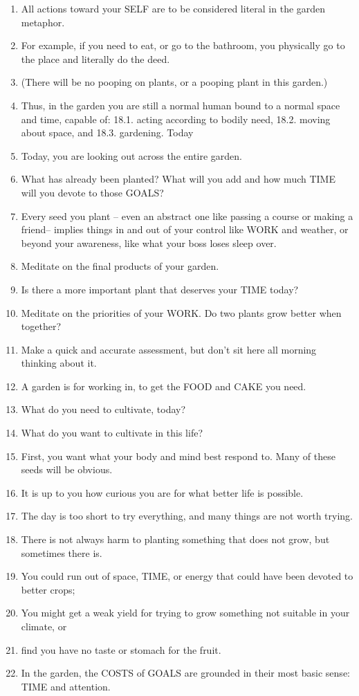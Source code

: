 \documentclass[
]{book}
\begin{document}
\begin{enumerate}
\item
  All actions toward your SELF are to be considered literal in the garden
  metaphor.
\item
  For example, if you need to eat, or go to the bathroom, you physically go to the
  place and literally do the deed.
\item
  (There will be no pooping on plants, or a pooping plant in this garden.)
\item
  Thus, in the garden you are still a normal human bound to a normal space and
  time, capable of:
  18.1. acting according to bodily need,
  18.2. moving about space, and
  18.3. gardening.
  Today
\item
  Today, you are looking out across the entire garden.
\item
  What has already been planted? What will you add and how much TIME will you
  devote to those GOALS?
\item
  Every seed you plant -- even an abstract one like passing a course or making a
  friend-- implies things in and out of your control like WORK and weather, or
  beyond your awareness, like what your boss loses sleep over.
\item
  Meditate on the final products of your garden.
\item
  Is there a more important plant that deserves your TIME today?
\item
  Meditate on the priorities of your WORK. Do two plants grow better when
  together?
\item
  Make a quick and accurate assessment, but don't sit here all morning thinking
  about it.
\item
  A garden is for working in, to get the FOOD and CAKE you need.
\item
  What do you need to cultivate, today?
\item
  What do you want to cultivate in this life?
\item
  First, you want what your body and mind best respond to. Many of these seeds
  will be obvious.
\item
  It is up to you how curious you are for what better life is possible.
\item
  The day is too short to try everything, and many things are not worth trying.
\item
  There is not always harm to planting something that does not grow, but
  sometimes there is.
\item
  You could run out of space, TIME, or energy that could have been devoted to
  better crops;
\item
  You might get a weak yield for trying to grow something not suitable in your
  climate, or
\item
  find you have no taste or stomach for the fruit.
\item
  In the garden, the COSTS of GOALS are grounded in their most basic sense: TIME
  and attention.
\end{enumerate}
\end{document}

